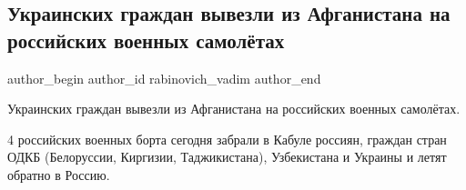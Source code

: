  
 
 
 
 
 
\subsection{Украинских граждан вывезли из Афганистана на российских военных самолётах}
\label{sec:25_08_2021.fb.rabinovich_vadim.1.evakuacia_afganistan_rossia}
 
\ifcmt
 author_begin
   author_id rabinovich_vadim
 author_end
\fi

Украинских граждан вывезли из Афганистана на российских военных самолётах. 

4 российских военных борта сегодня забрали в Кабуле россиян, граждан стран ОДКБ
(Белоруссии, Киргизии, Таджикистана), Узбекистана и Украины и летят обратно в
Россию.

